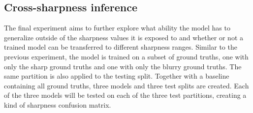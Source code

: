 \subsection{Cross-sharpness inference}
The final experiment aims to further explore what ability the model has to generalize outside of the sharpness values it is exposed to and whether or not a trained model can be transferred to different sharpness ranges.
Similar to the previous experiment, the model is trained on a subset of ground truths, one with only the sharp ground truths and one with only the blurry ground truths.
The same partition is also applied to the testing split.
Together with a baseline containing all ground truths, three models and three test splits are created.
Each of the three models will be tested on each of the three test partitions, creating a kind of sharpness confusion matrix.
